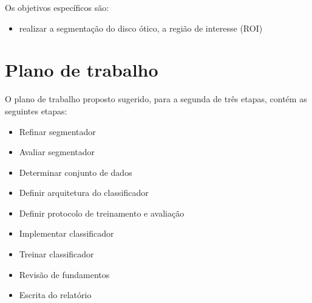 \documentclass[12pt]{article}
\begin{document}
Os objetivos específicos são:
\begin{itemize}
 \item realizar a segmentação do disco ótico, a região de interesse (ROI)
\end{itemize}

\bigskip

\section{Plano de trabalho}
\label{sec:schedule}

O plano de trabalho proposto sugerido, para a segunda de três etapas, contém as seguintes etapas:
\begin{itemize}
    \item Refinar segmentador
    \item Avaliar segmentador
    \item Determinar conjunto de dados
    \item Definir arquitetura do classificador
    \item Definir protocolo de treinamento e avaliação
    \item Implementar classificador
    \item Treinar classificador
    \item Revisão de fundamentos
    \item Escrita do relatório
\end{itemize}
\end{document}
